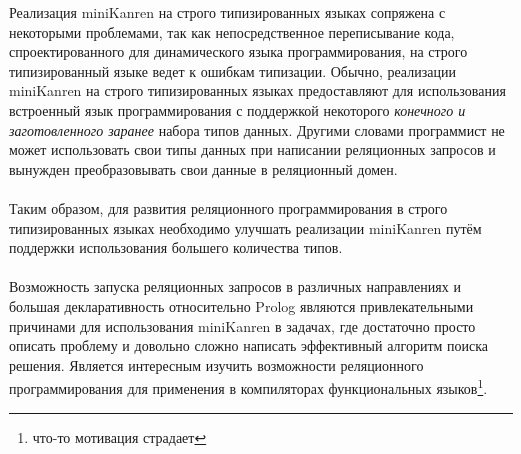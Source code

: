 Реализация miniKanren на строго типизированных языках сопряжена с некоторыми проблемами, так как непосредственное переписывание кода, спроектированного для динамического языка программирования, на строго типизированный языке ведет к ошибкам типизации. Обычно, реализации miniKanren на строго типизированных языках предоставляют для использования встроенный язык программирования с поддержкой некоторого \emph{конечного и заготовленного заранее} набора типов данных. Другими словами программист не может использовать свои типы данных при написании реляционных запросов и вынужден преобразовывать свои данные в реляционный домен.

\paragraph{} Таким образом, для развития реляционного программирования в строго типизированных языках необходимо улучшать реализации miniKanren путём поддержки использования большего количества типов. 

\paragraph{} Возможность запуска реляционных запросов в различных направлениях и большая декларативность относительно Prolog являются привлекательными причинами для использования miniKanren в задачах, где достаточно просто описать проблему и довольно сложно написать эффективный алгоритм поиска решения. Является интересным изучить возможности реляционного программирования для применения в компиляторах функциональных языков\footnote{что-то мотивация страдает}.


